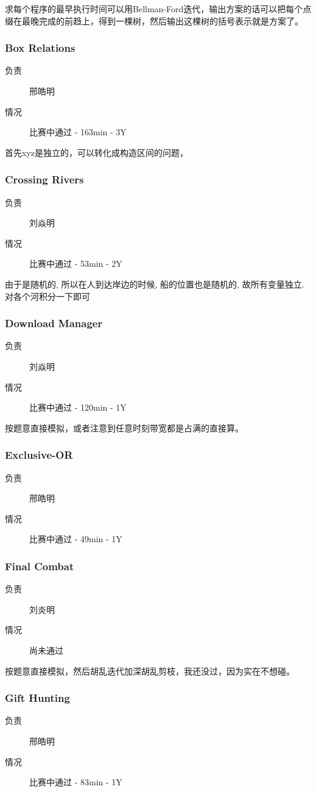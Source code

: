 \documentclass[a4paper, 11pt, nofonts, nocap, fancyhdr]{ctexart}
\newcommand{\problem}[1]{\subsubsection{#1}}
\begin{document}
求每个程序的最早执行时间可以用Bellman-Ford迭代，输出方案的话可以把每个点缀在最晚完成的前趋上，得到一棵树，然后输出这棵树的括号表示就是方案了。

\problem{Box Relations}

\begin{description}
\item[负责] 邢皓明
\item[情况] 比赛中通过 - 163min - 3Y
\end{description}

首先xyz是独立的，可以转化成构造区间的问题，

\problem{Crossing Rivers}

\begin{description}
\item[负责] 刘焱明
\item[情况] 比赛中通过 - 53min - 2Y
\end{description}

由于是随机的, 所以在人到达岸边的时候, 船的位置也是随机的, 故所有变量独立. 对各个河积分一下即可

\problem{Download Manager}

\begin{description}
\item[负责] 刘焱明
\item[情况] 比赛中通过 - 120min - 1Y
\end{description}

按题意直接模拟，或者注意到任意时刻带宽都是占满的直接算。

\problem{Exclusive-OR}

\begin{description}
\item[负责] 邢皓明
\item[情况] 比赛中通过 - 49min - 1Y
\end{description}

\problem{Final Combat}

\begin{description}
\item[负责] 刘炎明
\item[情况] 尚未通过
\end{description}

按题意直接模拟，然后胡乱迭代加深胡乱剪枝，我还没过，因为实在不想碰。

\problem{Gift Hunting}

\begin{description}
\item[负责] 邢皓明
\item[情况] 比赛中通过 - 83min - 1Y
\end{description}
\end{document}
